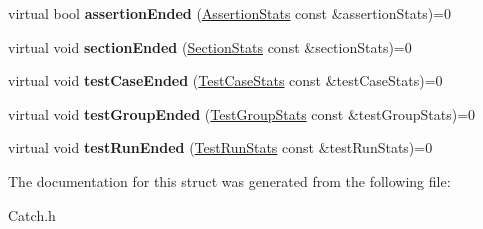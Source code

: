 \begin{DoxyCompactItemize}
\item 
\hypertarget{struct_catch_1_1_i_streaming_reporter_a5248ab87149e0f1abe2de96c387ff5e3}{virtual bool {\bfseries assertion\-Ended} (\hyperlink{struct_catch_1_1_assertion_stats}{Assertion\-Stats} const \&assertion\-Stats)=0}\label{struct_catch_1_1_i_streaming_reporter_a5248ab87149e0f1abe2de96c387ff5e3}

\item 
\hypertarget{struct_catch_1_1_i_streaming_reporter_aba7a6ce1f315da47b8017b5ca6d1d008}{virtual void {\bfseries section\-Ended} (\hyperlink{struct_catch_1_1_section_stats}{Section\-Stats} const \&section\-Stats)=0}\label{struct_catch_1_1_i_streaming_reporter_aba7a6ce1f315da47b8017b5ca6d1d008}

\item 
\hypertarget{struct_catch_1_1_i_streaming_reporter_ae295b98b77bab527be53ea9d35dfe66f}{virtual void {\bfseries test\-Case\-Ended} (\hyperlink{struct_catch_1_1_test_case_stats}{Test\-Case\-Stats} const \&test\-Case\-Stats)=0}\label{struct_catch_1_1_i_streaming_reporter_ae295b98b77bab527be53ea9d35dfe66f}

\item 
\hypertarget{struct_catch_1_1_i_streaming_reporter_abf668bf347eda4ba94fa2b3483ca4dd3}{virtual void {\bfseries test\-Group\-Ended} (\hyperlink{struct_catch_1_1_test_group_stats}{Test\-Group\-Stats} const \&test\-Group\-Stats)=0}\label{struct_catch_1_1_i_streaming_reporter_abf668bf347eda4ba94fa2b3483ca4dd3}

\item 
\hypertarget{struct_catch_1_1_i_streaming_reporter_a1ac383df84242bc55578e32ebca13e88}{virtual void {\bfseries test\-Run\-Ended} (\hyperlink{struct_catch_1_1_test_run_stats}{Test\-Run\-Stats} const \&test\-Run\-Stats)=0}\label{struct_catch_1_1_i_streaming_reporter_a1ac383df84242bc55578e32ebca13e88}

\end{DoxyCompactItemize}


The documentation for this struct was generated from the following file\-:\begin{DoxyCompactItemize}
\item 
Catch.\-h\end{DoxyCompactItemize}
